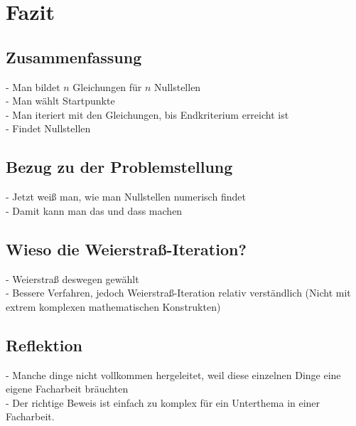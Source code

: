 \documentclass[12pt]{article}
\begin{document}

\section{Fazit}
\subsection{Zusammenfassung}
- Man bildet $n$ Gleichungen für $n$ Nullstellen\\
- Man wählt Startpunkte\\
- Man iteriert mit den Gleichungen, bis Endkriterium erreicht ist\\
- Findet Nullstellen

\subsection{Bezug zu der Problemstellung}
- Jetzt weiß man, wie man Nullstellen numerisch findet\\
- Damit kann man das und dass machen

\subsection{Wieso die Weierstraß-Iteration?}
- Weierstraß deswegen gewählt\\
- Bessere Verfahren, jedoch Weierstraß-Iteration relativ verständlich (Nicht mit extrem komplexen mathematischen Konstrukten)

\subsection{Reflektion}
- Manche dinge nicht vollkommen hergeleitet, weil diese einzelnen Dinge eine eigene Facharbeit bräuchten\\
- Der richtige Beweis ist einfach zu komplex für ein Unterthema in einer Facharbeit.
\end{document}
